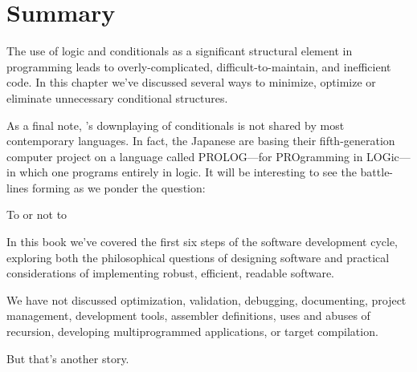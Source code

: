 \section{Summary}

The use of logic and conditionals as a significant structural element in
programming leads to overly-complicated, difficult-to-maintain, and
inefficient code. In this chapter we've discussed several ways to minimize,
optimize or eliminate unnecessary conditional structures.

As a final note, \Forth{}'s downplaying of conditionals is not shared
by most contemporary languages. In fact, the Japanese are basing their
fifth-generation computer project on a language called PROLOG---for
PROgramming in LOGic---in which one programs entirely in logic. It will
be interesting to see the battle-lines forming as we ponder the question:

\begin{tfquot}
To  or not to 
\end{tfquot}
In this book we've covered the first six steps of the software development
cycle, exploring both the philosophical questions of designing software
and practical considerations of implementing robust, efficient, readable
software.

We have not discussed optimization, validation, debugging, documenting,
project management, \Forth{} development tools, assembler
definitions, uses and abuses of recursion, developing multiprogrammed
applications, or target compilation.

But that's another story.

